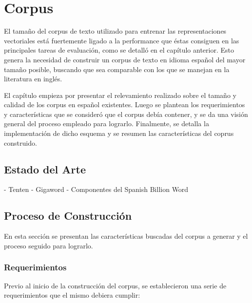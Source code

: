 \chapter{Corpus}

El tamaño del corpus de texto utilizado para entrenar las representaciones vectoriales está
fuertemente ligado a la performance que éstas consiguen en las principales tareas de evaluación,
como se detalló en el capítulo anterior. Esto genera la necesidad de construir un corpus de texto en
idioma español del mayor tamaño posible, buscando que sea comparable con los que se manejan en la
literatura en inglés.

El capítulo empieza por presentar el relevamiento realizado sobre el tamaño y calidad de los corpus
en español existentes. Luego se plantean los requerimientos y características que se consideró que
el corpus debía contener, y se da una visión general del proceso empleado para lograrlo. Finalmente,
se detalla la implementación de dicho esquema y se resumen las características del coprus
construido.

\section{Estado del Arte}

- Tenten
- Gigaword
- Componentes del Spanish Billion Word

\section{Proceso de Construcción}

En esta sección se presentan las características buscadas del corpus a generar y el proceso seguido
para lograrlo.

\subsection{Requerimientos}

Previo al inicio de la construcción del corpus, se establecieron una serie de requerimientos que el
mismo debiera cumplir:

